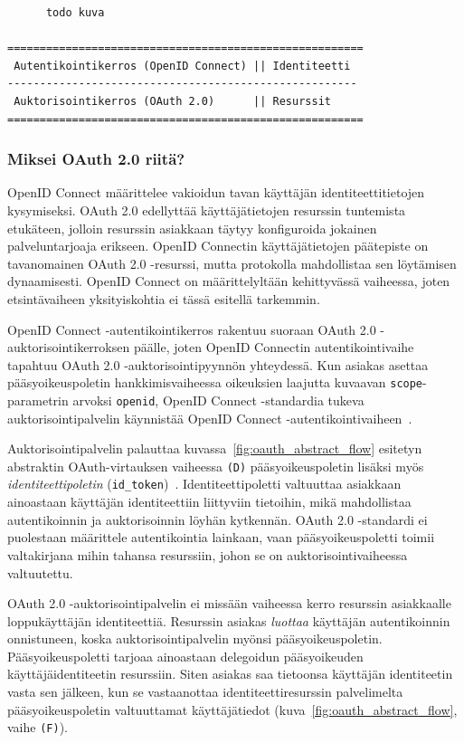 \documentclass[finnish,gradu]{tktltiki}
\begin{document}
  \begin{singlespacing}
    \begin{verbatim}
      todo kuva

=======================================================
 Autentikointikerros (OpenID Connect) || Identiteetti
------------------------------------------------------
 Auktorisointikerros (OAuth 2.0)      || Resurssit
=======================================================
    \end{verbatim}
  \end{singlespacing}


  \subsubsection{Miksei OAuth 2.0 riitä?} %
  \label{ssub:virtaukset}

  OpenID Connect määrittelee vakioidun tavan käyttäjän identiteettitietojen kysymiseksi. OAuth 2.0 edellyttää käyttäjätietojen resurssin tuntemista etukäteen, jolloin resurssin asiakkaan täytyy konfiguroida jokainen palveluntarjoaja erikseen. OpenID Connectin käyttäjätietojen päätepiste on tavanomainen OAuth 2.0 -resurssi, mutta protokolla mahdollistaa sen löytämisen dynaamisesti. OpenID Connect on määrittelyltään kehittyvässä vaiheessa, joten etsintävaiheen yksityiskohtia ei tässä esitellä tarkemmin.

  OpenID Connect -autentikointikerros rakentuu suoraan OAuth 2.0 -auktorisointikerroksen päälle, joten OpenID Connectin autentikointivaihe tapahtuu OAuth 2.0 -auktorisointipyynnön yhteydessä. Kun asiakas asettaa pääsyoikeuspoletin hankkimisvaiheessa oikeuksien laajutta kuvaavan \verb!scope!-parametrin arvoksi \verb!openid!, OpenID Connect -standardia tukeva auktorisointipalvelin käynnistää OpenID Connect -autentikointivaiheen~\cite{sakimura_openid_c_nutshell_2012}.

  Auktorisointipalvelin palauttaa kuvassa~\ref{fig:oauth_abstract_flow} esitetyn abstraktin OAuth-virtauksen vaiheessa \verb!(D)! pääsyoikeuspoletin lisäksi myös \emph{identiteettipoletin} (\verb!id_token!)~\cite{bradley_openid_c_id_token_2012}. Identiteettipoletti valtuuttaa asiakkaan ainoastaan käyttäjän identiteettiin liittyviin tietoihin, mikä mahdollistaa autentikoinnin ja auktorisoinnin löyhän kytkennän. OAuth 2.0 -standardi ei puolestaan määrittele autentikointia lainkaan, vaan pääsyoikeuspoletti toimii valtakirjana mihin tahansa resurssiin, johon se on auktorisointivaiheessa valtuutettu.

  OAuth 2.0 -auktorisointipalvelin ei missään vaiheessa kerro resurssin asiakkaalle loppukäyttäjän identiteettiä. Resurssin asiakas \emph{luottaa} käyttäjän autentikoinnin onnistuneen, koska auktorisointipalvelin myönsi pääsyoikeuspoletin. Pääsyoikeuspoletti tarjoaa ainoastaan delegoidun pääsyoikeuden käyttäjäidentiteetin resurssiin. Siten asiakas saa tietoonsa käyttäjän identiteetin vasta sen jälkeen, kun se vastaanottaa identiteettiresurssin palvelimelta pääsyoikeuspoletin valtuuttamat käyttäjätiedot (kuva~\ref{fig:oauth_abstract_flow}, vaihe \verb!(F)!).
\end{document}
